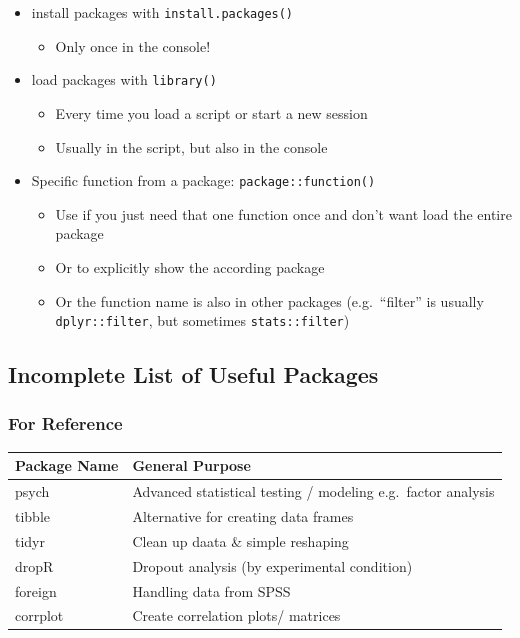\documentclass[
]{book}
\providecommand{\tightlist}{%
  \setlength{\itemsep}{0pt}\setlength{\parskip}{0pt}}
\begin{document}
\begin{itemize}
\tightlist
\item
  install packages with \texttt{install.packages()}

  \begin{itemize}
  \tightlist
  \item
    Only once in the console!
  \end{itemize}
\item
  load packages with \texttt{library()}

  \begin{itemize}
  \tightlist
  \item
    Every time you load a script or start a new session
  \item
    Usually in the script, but also in the console
  \end{itemize}
\item
  Specific function from a package: \texttt{package::function()}

  \begin{itemize}
  \tightlist
  \item
    Use if you just need that one function once and don't want load the entire package
  \item
    Or to explicitly show the according package
  \item
    Or the function name is also in other packages (e.g.~``filter'' is usually \texttt{dplyr::filter}, but sometimes \texttt{stats::filter})
  \end{itemize}
\end{itemize}

\subsection{Incomplete List of Useful Packages}\label{incomplete-list-of-useful-packages}

\subsubsection{For Reference}\label{for-reference}

\begin{longtable}[]{@{}ll@{}}
\toprule\noalign{}
Package Name & General Purpose \\
\midrule\noalign{}
\endhead
\bottomrule\noalign{}
\endlastfoot
psych & Advanced statistical testing / modeling e.g.~factor analysis \\
tibble & Alternative for creating data frames \\
tidyr & Clean up daata \& simple reshaping \\
dropR & Dropout analysis (by experimental condition) \\
foreign & Handling data from SPSS \\
corrplot & Create correlation plots/ matrices \\
\end{longtable}
\end{document}
